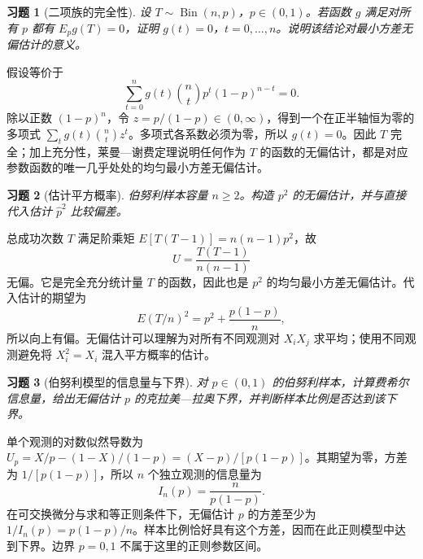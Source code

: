 \documentclass[12pt,fontset=fandol]{ctexart}
\newtheorem{exercise}{习题}[section]
\begin{document}
\begin{exercise}[二项族的完全性]\label{q:B11.4}
设 $T\sim\operatorname{Bin}(n,p)$，$p\in(0,1)$。若函数 $g$ 满足对所有 $p$ 都有 $E_pg(T)=0$，证明 $g(t)=0$，$t=0,\ldots,n$。说明该结论对最小方差无偏估计的意义。\par{}
\end{exercise}

\begin{solve}\label{a:B11.4}假设等价于\[\sum_{t=0}^ng(t)\binom nt p^t(1-p)^{n-t}=0.\]除以正数 $(1-p)^n$，令 $z=p/(1-p)\in(0,\infty)$，得到一个在正半轴恒为零的多项式 $\sum_tg(t)\binom ntz^t$。多项式各系数必须为零，所以 $g(t)=0$。因此 $T$ 完全；加上充分性，莱曼—谢费定理说明任何作为 $T$ 的函数的无偏估计，都是对应参数函数的唯一几乎处处的均匀最小方差无偏估计。\end{solve}

\begin{exercise}[估计平方概率]\label{q:B11.5}
伯努利样本容量 $n\ge2$。构造 $p^2$ 的无偏估计，并与直接代入估计 $\widehat p^2$ 比较偏差。\par{}
\end{exercise}

\begin{solve}\label{a:B11.5}总成功次数 $T$ 满足阶乘矩 $E[T(T-1)]=n(n-1)p^2$，故\[U=\frac{T(T-1)}{n(n-1)}\]无偏。它是完全充分统计量 $T$ 的函数，因此也是 $p^2$ 的均匀最小方差无偏估计。代入估计的期望为\[E(T/n)^2=p^2+\frac{p(1-p)}n,\]所以向上有偏。无偏估计可以理解为对所有不同观测对 $X_iX_j$ 求平均；使用不同观测避免将 $X_i^2=X_i$ 混入平方概率的估计。\end{solve}

\begin{exercise}[伯努利模型的信息量与下界]\label{q:B11.6}
对 $p\in(0,1)$ 的伯努利样本，计算费希尔信息量，给出无偏估计 $p$ 的克拉美—拉奥下界，并判断样本比例是否达到该下界。\par{}
\end{exercise}

\begin{solve}\label{a:B11.6}单个观测的对数似然导数为 $U_p=X/p-(1-X)/(1-p)=(X-p)/[p(1-p)]$。其期望为零，方差为 $1/[p(1-p)]$，所以 $n$ 个独立观测的信息量为\[I_n(p)=\frac{n}{p(1-p)}.\]在可交换微分与求和等正则条件下，无偏估计 $p$ 的方差至少为 $1/I_n(p)=p(1-p)/n$。样本比例恰好具有这个方差，因而在此正则模型中达到下界。边界 $p=0,1$ 不属于这里的正则参数区间。\end{solve}
\end{document}
